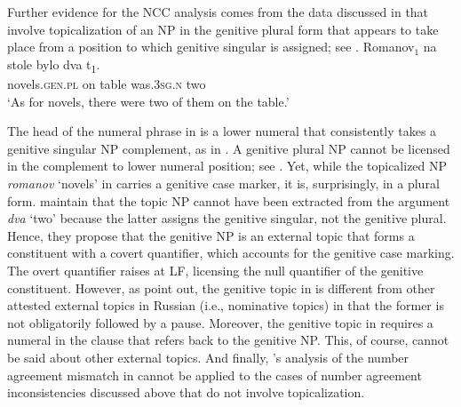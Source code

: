 \documentclass[output=paper,
modfonts,
newtxmath,
hidelinks
]{langscibook}
\begin{document}
\section{\citet{Franks-House1982}}\label{s4}
Further evidence for the NCC analysis comes from the data discussed in \citet{Franks-House1982} that involve topicalization of an NP in the genitive plural form that appears to take place from a position to which genitive singular is assigned; see .
\ea \label{ex27}
\gll Romanov$_1$  na  stole  bylo  dva         t\textsubscript{1}.\\
     novels.\textsc{gen.pl}  on  table  was.\textsc{3sg.n}  two\\\hfill\citep[157]{Franks-House1982}
\glt `As for novels, there were two of them on the table.'\\
\z
\ea \label{ex28}
	\z
\z 

\noindent The head of the numeral phrase in  is a lower numeral that consistently takes a genitive singular NP complement, as in . A genitive plural NP cannot be licensed in the complement to lower numeral position; see . Yet, while the topicalized NP \textit{romanov} ‘novels’ in  carries a genitive case marker, it is, surprisingly, in a plural form. \citeauthor{Franks-House1982} maintain that the topic NP cannot have been extracted from the argument \textit{dva} ‘two’ because the latter assigns the genitive singular, not the genitive plural. Hence, they propose that the genitive NP is an external topic that forms a constituent with a covert quantifier, which accounts for the genitive case marking. The overt quantifier raises at LF, licensing the null quantifier of the genitive constituent. However, as \citeauthor{Franks-House1982} point out, the genitive topic in  is different from other attested external topics in Russian (i.e., nominative topics) in that the former is not obligatorily followed by a pause. Moreover, the genitive topic in  requires a numeral in the clause that refers back to the genitive NP. This, of course, cannot be said about other external topics. And finally, \citeauthor{Franks-House1982}’s analysis of the number agreement mismatch in  cannot be applied to the cases of number agreement inconsistencies discussed above that do not involve topicalization. 
\end{document}
